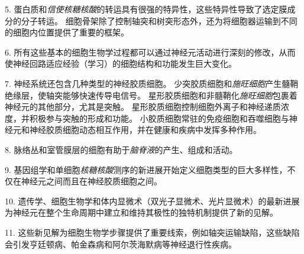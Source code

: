 5. 蛋白质和\textit{信使核糖核酸}的转运具有很强的特异性，这些特异性导致了选定膜成分的分子转运。
细胞骨架除了控制轴突和树突形态外，还为将细胞器运输到不同的细胞内位置提供了重要的框架。


6. 所有这些基本的细胞生物学过程都可以通过神经元活动进行深刻的修改，从而使神经回路适应经验（学习）的细胞结构和功能发生巨大变化。


7. 神经系统还包含几种类型的神经胶质细胞。
少突胶质细胞和\textit{施旺细胞}产生髓鞘绝缘层，使轴突能够快速传导电信号。
星形胶质细胞和非髓鞘化\textit{施旺细胞}包裹着神经元的其他部分，尤其是突触。 
星形胶质细胞控制细胞外离子和神经递质浓度，并积极参与突触的形成和功能。
小胶质细胞常驻的免疫细胞和吞噬细胞与神经元和神经胶质细胞动态相互作用，并在健康和疾病中发挥多种作用。


8. 脉络丛和室管膜层的细胞有助于\textit{脑脊液}的产生、组成和活动。


9. 基因组学和单细胞\textit{核糖核酸}测序的新进展开始定义细胞类型的巨大多样性，不仅在神经元之间而且在神经胶质细胞之间。


10. 遗传学、细胞生物学和体内显微术（双光子显微术、光片显微术）的最新进展为神经元在整个生命周期中建立和维持其极性的独特机制提供了新的见解。


11. 这些新见解为细胞生物学步骤提供了重要线索，例如轴突运输缺陷，这些缺陷会引发亨廷顿病、帕金森病和阿尔茨海默病等神经退行性疾病。




